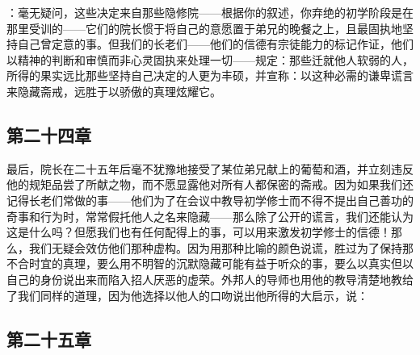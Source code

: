 ：毫无疑问，这些决定来自那些隐修院——根据你的叙述，你弃绝的初学阶段是在那里受训的——它们的院长惯于将自己的意愿置于弟兄的晚餐之上，且最固执地坚持自己曾定意的事。但我们的长老们——他们的信德有宗徒能力的标记作证，他们以精神的判断和审慎而非心灵固执来处理一切——规定：那些迁就他人软弱的人，所得的果实远比那些坚持自己决定的人更为丰硕，并宣称：以这种必需的谦卑谎言来隐藏斋戒，远胜于以骄傲的真理炫耀它。\par


\subsection{第二十四章}

\par

最后，院长在二十五年后毫不犹豫地接受了某位弟兄献上的葡萄和酒，并立刻违反他的规矩品尝了所献之物，而不愿显露他对所有人都保密的斋戒。因为如果我们还记得长老们常做的事——他们为了在会议中教导初学修士而不得不提出自己善功的奇事和行为时，常常假托他人之名来隐藏——那么除了公开的谎言，我们还能认为这是什么吗？但愿我们也有任何配得上的事，可以用来激发初学修士的信德！那么，我们无疑会效仿他们那种虚构。因为用那种比喻的颜色说谎，胜过为了保持那不合时宜的真理，要么用不明智的沉默隐藏可能有益于听众的事，要么以真实但以自己的身份说出来而陷入招人厌恶的虚荣。外邦人的导师也用他的教导清楚地教给了我们同样的道理，因为他选择以他人的口吻说出他所得的大启示，说： \par


\subsection{第二十五章}

\par

